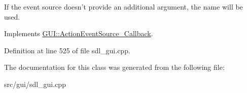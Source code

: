 If the event source doesn't provide an additional argument, the name will be used. 

Implements \hyperlink{structGUI_1_1ActionEventSource__Callback_a36df23a424558a83b45e3e3d5c175cf2}{G\-U\-I\-::\-Action\-Event\-Source\-\_\-\-Callback}.



Definition at line 525 of file sdl\-\_\-gui.\-cpp.



The documentation for this class was generated from the following file\-:\begin{DoxyCompactItemize}
\item 
src/gui/sdl\-\_\-gui.\-cpp\end{DoxyCompactItemize}
